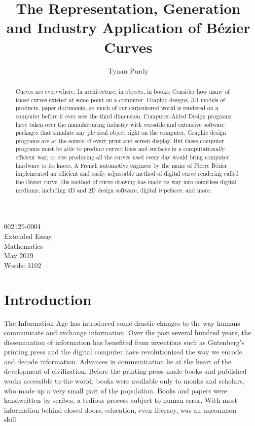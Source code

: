 \documentclass[12pt,letterpaper]{article}
\title{The Representation, Generation and Industry Application of B\'ezier Curves}
\author{Tynan Purdy}
\date{\vspace{-5ex}}
\begin{document}
\large
\parindent=0.5in
{\fontsize{12}{14.4}
	{\singlespace
	    \maketitle
	    \begin{center}
	    \vspace{4mm}
	    002129-0004 \\
	    \vspace{4mm}
	    Extended Essay \\
	    \vspace{4mm}
	    Mathematics \\
	    \vspace{4mm}
	    May 2019 \\
	    \vspace{4mm}
	    Words: 3102 \\
	\end{center}
	}
}	

\newpage
{}
\begin{abstract}
Curves are everywhere. In architecture, in objects, in books. Consider how many of those curves existed at some point on a computer. Graphic designs, 3D models of products, paper documents, so much of our carpentered world is rendered on a computer before it ever sees the third dimension. Computer-Aided Design programs have taken over the manufacturing industry with versatile and extensive software packages that simulate any physical object right on the computer. Graphic design programs are at the source of every print and screen display. But these computer programs must be able to produce curved lines and surfaces in a computationally efficient way, or else producing all the curves used every day would bring computer hardware to its knees. A French automotive engineer by the name of Pierre B\'ezier implemented an efficient and easily adjustable method of digital curve rendering called the B\'ezier curve. His method of curve drawing has made its way into countless digital mediums, including 3D and 2D design software, digital typefaces, and more.
\end{abstract}

\newpage
\tableofcontents

\newpage
\section{Introduction}
The Information Age has introduced some drastic changes to the way humans communicate and exchange information. Over the past several hundred years, the dissemination of information has benefited from inventions such as Gutenberg’s printing press and the digital computer have revolutionized the way we encode and decode information. Advances in communication lie at the heart of the development of civilization. Before the printing press made books and published works accessible to the world, books were available only to monks and scholars, who made up a very small part of the population. Books and papers were handwritten by scribes, a tedious process subject to human error. With most information behind closed doors, education, even literacy, was an uncommon skill. 
\end{document}
